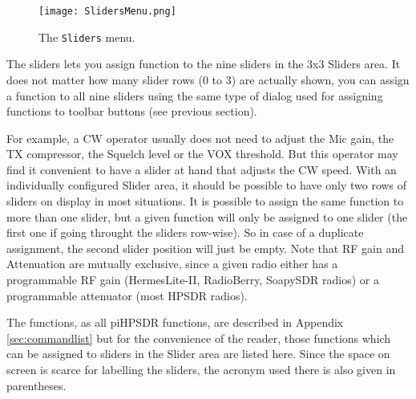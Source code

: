 \documentclass[12pt]{book}
\def\bltt#1{\texttt{\color{blue}#1}}
\def\pH{pi\-HPSDR\xspace}
\begin{document}
\begin{figure}[ht!]
\center
\texttt{[image: SlidersMenu.png]}
\caption{The \bltt{Sliders} menu.}
\label{fig:SlidersMenu}
\end{figure}

The sliders lets you assign function to the nine sliders in the 3x3 Sliders area. It does not matter
how many slider rows (0 to 3) are actually shown, you can assign a function to all nine sliders
using the same type of dialog used for assigning functions to toolbar buttons (see previous section).

For example, a CW operator usually does not need to adjust the Mic gain, the TX compressor, the Squelch
level or the VOX threshold. But
this operator may find it convenient to have a slider at hand that adjusts the CW speed. With an
individually configured Slider area, it should be possible to have only two rows of sliders on display
in most situations. It is possible to assign the same function to more than one slider, but a given
function will only be assigned to one slider (the first one if going throught the sliders row-wise).
So in case of a duplicate assignment, the second slider position will just be empty.
Note that RF gain and Attenuation are mutually exclusive, since a given radio either has a programmable
RF gain (HermesLite-II, RadioBerry, SoapySDR radios) or a programmable attenuator (most HPSDR radios).

The functions, as all \pH functions, are described in Appendix \ref{sec:commandlist} but for
the convenience of the reader, those functions which can be assigned to sliders in the Slider area
are listed here. Since the space
on screen is scarce for labelling the sliders, the acronym used there is also given in parentheses.
\end{document}
